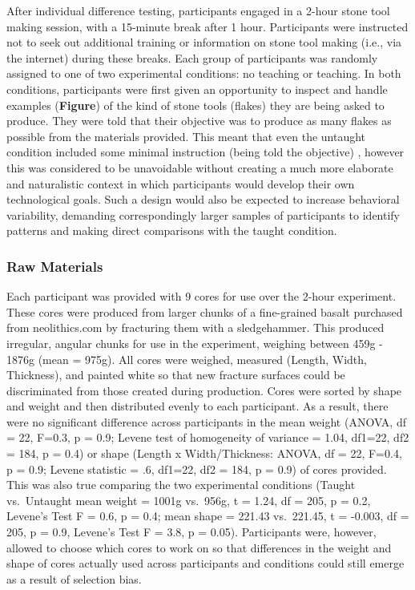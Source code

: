 \documentclass[smallextended]{svjour3}       %
\begin{document}
After individual difference testing, participants engaged in a 2-hour
stone tool making session, with a 15-minute break after 1 hour.
Participants were instructed not to seek out additional training or
information on stone tool making (i.e., via the internet) during these
breaks. Each group of participants was randomly assigned to one of two
experimental conditions: no teaching or teaching. In both conditions,
participants were first given an opportunity to inspect and handle
examples (\textbf{Figure}) of the kind of stone tools (flakes) they are
being asked to produce. They were told that their objective was to
produce as many flakes as possible from the materials provided. This
meant that even the untaught condition included some minimal instruction
(being told the objective) , however this was considered to be
unavoidable without creating a much more elaborate and naturalistic
context in which participants would develop their own technological
goals. Such a design would also be expected to increase behavioral
variability, demanding correspondingly larger samples of participants to
identify patterns and making direct comparisons with the taught
condition.

\hypertarget{raw-materials}{%
\subsubsection{\texorpdfstring{\textbf{Raw
Materials}}{Raw Materials}}\label{raw-materials}}

Each participant was provided with 9 cores for use over the 2-hour
experiment. These cores were produced from larger chunks of a
fine-grained basalt purchased from neolithics.com by fracturing them
with a sledgehammer. This produced irregular, angular chunks for use in
the experiment, weighing between 459g - 1876g (mean = 975g). All cores
were weighed, measured (Length, Width, Thickness), and painted white so
that new fracture surfaces could be discriminated from those created
during production. Cores were sorted by shape and weight and then
distributed evenly to each participant. As a result, there were no
significant difference across participants in the mean weight (ANOVA, df
= 22, F=0.3, p = 0.9; Levene test of homogeneity of variance = 1.04,
df1=22, df2 = 184, p = 0.4) or shape (Length x Width/Thickness: ANOVA,
df = 22, F=0.4, p = 0.9; Levene statistic = .6, df1=22, df2 = 184, p =
0.9) of cores provided. This was also true comparing the two
experimental conditions (Taught vs.~Untaught mean weight = 1001g
vs.~956g, t = 1.24, df = 205, p = 0.2, Levene's Test F = 0.6, p = 0.4;
mean shape = 221.43 vs.~221.45, t = -0.003, df = 205, p = 0.9, Levene's
Test F = 3.8, p = 0.05). Participants were, however, allowed to choose
which cores to work on so that differences in the weight and shape of
cores actually used across participants and conditions could still
emerge as a result of selection bias.
\end{document}
